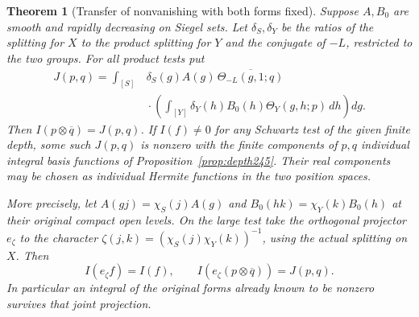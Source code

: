 \documentclass[a4paper,11pt]{article}
\newtheorem{theorem}[proposition]{Theorem}
\theoremstyle{definition}
\theoremstyle{remark}
\numberwithin{equation}{section}
\begin{document}
\begin{theorem}[Transfer of nonvanishing with both forms fixed]
\label{thm:seesaw245}
Suppose \(A,B_0\) are smooth and rapidly decreasing on Siegel sets.
Let \(\delta_S,\delta_Y\) be the ratios of the splitting for \(X\)
to the product splitting for \(Y\) and the conjugate of \(-L\),
restricted to the two groups. For all product tests put
\[
 \begin{split}
 J(p,q)=\int_{[S]} &\delta_S(g)A(g)\,
                \overline{\Theta_{-L}(g,1;q)}\\[-2pt]
        &{}\cdot\left(\int_{[Y]}\delta_Y(h)B_0(h)
                           \Theta_Y(g,h;p)\,dh\right)dg .
 \end{split}
\]
Then \(I(p\otimes\overline q)=J(p,q)\). If \(I(f)\ne0\) for
any Schwartz test of the given finite depth, some such \(J(p,q)\)
is nonzero with the finite components of \(p,q\) individual integral
basis functions of Proposition~\ref{prop:depth245}. Their real
components may be chosen as individual Hermite functions in the
two position spaces.

More precisely, let \(A(gj)=\chi_S(j)A(g)\) and
\(B_0(hk)=\chi_Y(k)B_0(h)\) at their original compact open levels.
On the large test take the orthogonal projector \(e_\zeta\) to the
character \(\zeta(j,k)=(\chi_S(j)\chi_Y(k))^{-1}\), using the
actual splitting on \(X\). Then
\[
                 I(e_\zeta f)=I(f),\qquad
     I(e_\zeta(p\otimes\overline q))=J(p,q).
\]
In particular an integral of the original forms already known to be
nonzero survives that joint projection.
\end{theorem}
\end{document}
